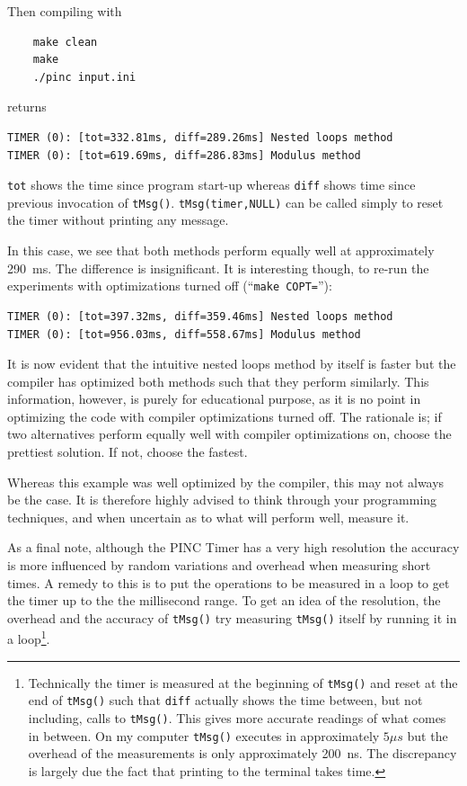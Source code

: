 \documentclass[10pt,a4paper]{article}
\begin{document}
Then compiling with
\begin{verbatim}
	make clean
	make
	./pinc input.ini
\end{verbatim}
returns

\begin{verbatim}
TIMER (0): [tot=332.81ms, diff=289.26ms] Nested loops method
TIMER (0): [tot=619.69ms, diff=286.83ms] Modulus method
\end{verbatim}
\verb$tot$ shows the time since program start-up whereas \verb$diff$ shows time since previous invocation of \lstinline$tMsg()$. \lstinline$tMsg(timer,NULL)$ can be called simply to reset the timer without printing any message.

In this case, we see that both methods perform equally well at approximately 290~ms. The difference is insignificant. It is interesting though, to re-run the experiments with optimizations turned off (``\verb$make COPT=$''):

\begin{verbatim}
TIMER (0): [tot=397.32ms, diff=359.46ms] Nested loops method
TIMER (0): [tot=956.03ms, diff=558.67ms] Modulus method
\end{verbatim}
It is now evident that the intuitive nested loops method by itself is faster but the compiler has optimized both methods such that they perform similarly. This information, however, is purely for educational purpose, as it is no point in optimizing the code with compiler optimizations turned off. The rationale is; if two alternatives perform equally well with compiler optimizations on, choose the prettiest solution. If not, choose the fastest.

Whereas this example was well optimized by the compiler, this may not always be the case. It is therefore highly advised to think through your programming techniques, and when uncertain as to what will perform well, measure it.

As a final note, although the PINC Timer has a very high resolution the accuracy is more influenced by random variations and overhead when measuring short times. A remedy to this is to put the operations to be measured in a loop to get the timer up to the the millisecond range. To get an idea of the resolution, the overhead and the accuracy of \lstinline$tMsg()$ try measuring \lstinline$tMsg()$ itself by running it in a loop\footnote{Technically the timer is measured at the beginning of \lstinline$tMsg()$ and reset at the end of \lstinline$tMsg()$ such that \texttt{diff} actually shows the time between, but not including, calls to \lstinline$tMsg()$. This gives more accurate readings of what comes in between. On my computer \lstinline$tMsg()$ executes in approximately $5 \mu s$ but the overhead of the measurements is only approximately 200~ns. The discrepancy is largely due the fact that printing to the terminal takes time.}.
\end{document}
